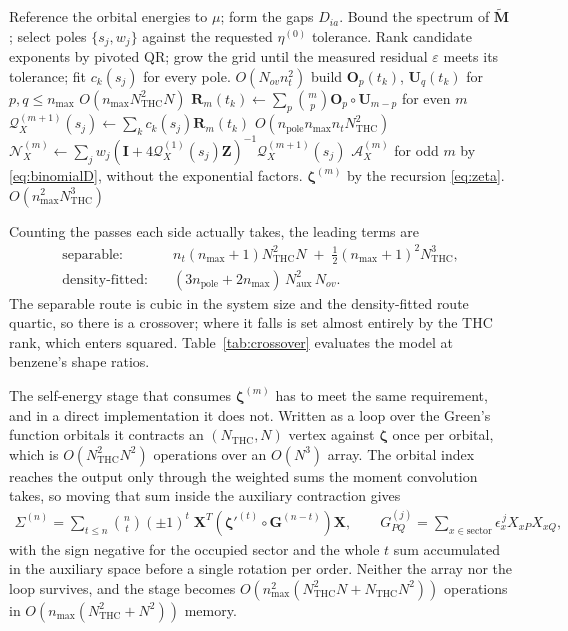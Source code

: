 \documentclass[11pt]{article}
\newcommand{\mat}[1]{{\mathbf{#1}}}
\newcommand{\parth}[1]{\left(#1\right)}
\newcommand{\Dcal}{\mathcal{A}}
\newcommand{\Qcal}{\mathcal{Q}}
\newcommand{\Ncal}{\mathcal{N}}
\newcommand{\Had}{\circ}
\begin{document}
\begin{algorithm}[h]
\caption{THC dRPA density--density moments}
\begin{algorithmic}[1]
\State Reference the orbital energies to $\mu$; form the gaps $D_{ia}$.
\State Bound the spectrum of $\tilde{\mat{M}}$; select poles $\{s_j, w_j\}$ against the
       requested $\eta^{(0)}$ tolerance.
\State Rank candidate exponents by pivoted QR; grow the grid until the measured residual
       $\varepsilon$ meets its tolerance; fit $c_k(s_j)$ for every pole. \hfill $O(N_{ov} n_t^2)$
    \State build $\mat{O}_p(t_k)$, $\mat{U}_q(t_k)$ for $p,q \le n_{\max}$ \hfill $O(n_{\max} N_{\text{THC}}^2 N)$
    \State $\mat{R}_m(t_k) \gets \sum_p \binom{m}{p} \mat{O}_p \Had \mat{U}_{m-p}$ for even $m$
\EndFor
\State $\Qcal_X^{(m+1)}(s_j) \gets \sum_k c_k(s_j) \mat{R}_m(t_k)$ \hfill $O(n_{\text{pole}} n_{\max} n_t N_{\text{THC}}^2)$
\State $\Ncal_X^{(m)} \gets \sum_j w_j (\mat{I} + 4\Qcal_X^{(1)}(s_j)\mat{Z})^{-1} \Qcal_X^{(m+1)}(s_j)$
\State $\Dcal_X^{(m)}$ for odd $m$ by \eqref{eq:binomialD}, without the exponential factors.
\State $\bm\zeta^{(m)}$ by the recursion \eqref{eq:zeta}. \hfill $O(n_{\max}^2 N_{\text{THC}}^3)$
\end{algorithmic}
\end{algorithm}

Counting the passes each side actually takes, the leading terms are
\begin{align}
    \text{separable:} \quad
        & n_t (n_{\max}+1) N_{\text{THC}}^2 N
          \;+\; \tfrac{1}{2}(n_{\max}+1)^2 N_{\text{THC}}^3 , \\
    \text{density-fitted:} \quad
        & (3 n_{\text{pole}} + 2 n_{\max})\, N_{\text{aux}}^2\, N_{ov} .
\end{align}
The separable route is cubic in the system size and the density-fitted route quartic, so
there is a crossover; where it falls is set almost entirely by the THC rank, which enters
squared. Table~\ref{tab:crossover} evaluates the model at benzene's shape ratios.

The self-energy stage that consumes $\bm\zeta^{(m)}$ has to meet the same requirement,
and in a direct implementation it does not. Written as a loop over the Green's function
orbitals it contracts an $(N_{\text{THC}}, N)$ vertex against $\bm\zeta$ once per
orbital, which is $O(N_{\text{THC}}^2 N^2)$ operations over an $O(N^3)$ array. The
orbital index reaches the output only through the weighted sums the moment convolution
takes, so moving that sum inside the auxiliary contraction gives
\begin{align}
    \Sigma^{(n)} = \sum_{t \le n} \binom{n}{t} (\pm 1)^t\;
        \mat{X}^T \parth{ \bm\zeta'^{(t)} \Had \mat{G}^{(n-t)} } \mat{X} ,
    \qquad
    G^{(j)}_{PQ} = \sum_{x \in \text{sector}} \epsilon_x^{\,j} X_{xP} X_{xQ} ,
\end{align}
with the sign negative for the occupied sector and the whole $t$ sum accumulated in the
auxiliary space before a single rotation per order. Neither the array nor the loop
survives, and the stage becomes $O(n_{\max}^2 (N_{\text{THC}}^2 N + N_{\text{THC}} N^2))$
operations in $O(n_{\max}(N_{\text{THC}}^2 + N^2))$ memory.
\end{document}
